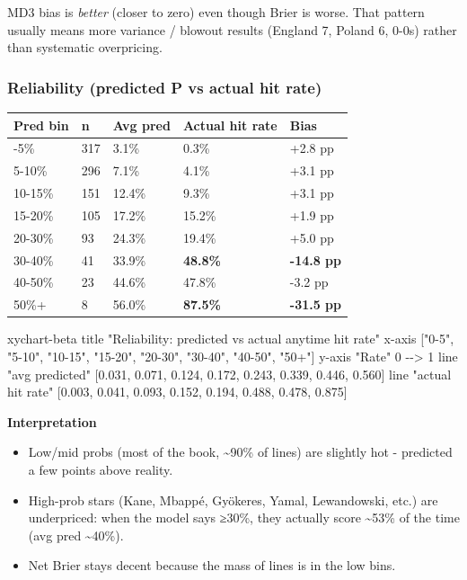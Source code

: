 \documentclass[
]{article}
\newenvironment{Shaded}{\begin{snugshade}}{\end{snugshade}}
\newcommand{\NormalTok}[1]{#1}
\newcounter{none} %
\providecommand{\tightlist}{%
  \setlength{\itemsep}{0pt}\setlength{\parskip}{0pt}}
\begin{document}
MD3 bias is \emph{better} (closer to zero) even though Brier is worse.
That pattern usually means more variance / blowout results (England 7,
Poland 6, 0-0s) rather than systematic overpricing.

\subsubsection{Reliability (predicted P vs actual hit
rate)}\label{reliability-predicted-p-vs-actual-hit-rate}

{\def\LTcaptype{none} %
\begin{longtable}[]{@{}lllll@{}}
\toprule\noalign{}
Pred bin & n & Avg pred & Actual hit rate & Bias \\
\midrule\noalign{}
\endhead
\bottomrule\noalign{}
\endlastfoot
0-5\% & 317 & 3.1\% & 0.3\% & +2.8 pp \\
5-10\% & 296 & 7.1\% & 4.1\% & +3.1 pp \\
10-15\% & 151 & 12.4\% & 9.3\% & +3.1 pp \\
15-20\% & 105 & 17.2\% & 15.2\% & +1.9 pp \\
20-30\% & 93 & 24.3\% & 19.4\% & +5.0 pp \\
30-40\% & 41 & 33.9\% & \textbf{48.8\%} & \textbf{-14.8 pp} \\
40-50\% & 23 & 44.6\% & 47.8\% & -3.2 pp \\
50\%+ & 8 & 56.0\% & \textbf{87.5\%} & \textbf{-31.5 pp} \\
\end{longtable}
}

\begin{Shaded}
\begin{Highlighting}[]
\NormalTok{xychart{-}beta}
\NormalTok{  title "Reliability: predicted vs actual anytime hit rate"}
\NormalTok{  x{-}axis ["0{-}5", "5{-}10", "10{-}15", "15{-}20", "20{-}30", "30{-}40", "40{-}50", "50+"]}
\NormalTok{  y{-}axis "Rate" 0 {-}{-}\textgreater{} 1}
\NormalTok{  line "avg predicted" [0.031, 0.071, 0.124, 0.172, 0.243, 0.339, 0.446, 0.560]}
\NormalTok{  line "actual hit rate" [0.003, 0.041, 0.093, 0.152, 0.194, 0.488, 0.478, 0.875]}
\end{Highlighting}
\end{Shaded}

\textbf{Interpretation}

\begin{itemize}
\tightlist
\item
  Low/mid probs (most of the book, \textasciitilde90\% of lines) are
  slightly hot - predicted a few points above reality.
\item
  High-prob stars (Kane, Mbappé, Gyökeres, Yamal, Lewandowski, etc.) are
  underpriced: when the model says ≥30\%, they actually score
  \textasciitilde53\% of the time (avg pred \textasciitilde40\%).
\item
  Net Brier stays decent because the mass of lines is in the low bins.
\end{itemize}
\end{document}
